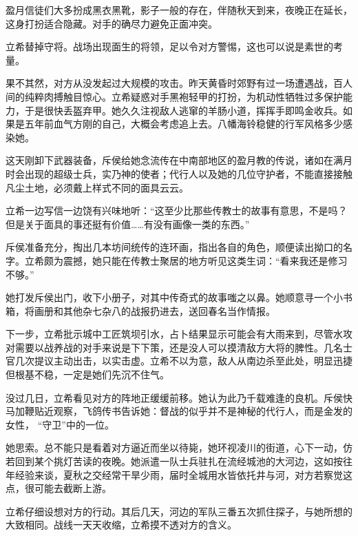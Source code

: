 \documentclass{article}
\begin{document}
盈月信徒们大多扮成黑衣黑靴，影子一般的存在，伴随秋天到来，夜晚正在延长，这身打扮适合隐藏。对手的确尽力避免正面冲突。



立希替掉守将。战场出现面生的将领，足以令对方警惕，这也可以说是素世的考量。



果不其然，对方从没发起过大规模的攻击。昨天黄昏时郊野有过一场遭遇战，百人间的纯粹肉搏触目惊心。立希疑惑对手黑袍轻甲的打扮，为机动性牺牲过多保护能力，于是很快丢盔弃甲。她久久注视敌人逃窜的羊肠小道，挥挥手即鸣金收兵。如果是五年前血气方刚的自己，大概会考虑追上去。八幡海铃稳健的行军风格多少感染她。



这天刚卸下武器装备，斥侯给她念流传在中南部地区的盈月教的传说，诸如在满月时会出现的超级士兵，实乃神的使者；代行人以及她的几位守护者，不能直接接触凡尘土地，必须戴上样式不同的面具云云。



立希一边写信一边饶有兴味地听：“这至少比那些传教士的故事有意思，不是吗？但是关于面具的事还挺有价值……有没有画像一类的东西。”



斥侯准备充分，掏出几本坊间统传的连环画，指出各自的角色，顺便读出拗口的名字。立希颇为震撼，她只能在传教士聚居的地方听见这类生词：“看来我还是修习不够。”



她打发斥侯出门，收下小册子，对其中传奇式的故事嗤之以鼻。她顺意寻一个小书箱，将画册和其他杂七杂八的战报扔进去，送回春名当作情报。



下一步，立希批示城中工匠筑坝引水，占卜结果显示可能会有大雨来到，尽管水攻对需要以战养战的对手来说是下下策，还是没人可以摸清敌方大将的脾性。几名士官几次提议主动出击，以实击虚。立希不以为意，敌人从南边杀至此处，明显迅捷但根基不稳，一定是她们先沉不住气。



没过几日，立希看见对方的阵地正缓缓前移。她认为此乃千载难逢的良机。斥侯快马加鞭贴近观察，飞鸽传书告诉她：督战的似乎并不是神秘的代行人，而是金发的女性， “守卫”中的一位。



她思索。总不能只是看着对方逼近而坐以待毙，她环视凌川的街道，心下一动，仿若回到某个挑灯苦读的夜晚。她派遣一队士兵驻扎在流经城池的大河边，这如按往年经验来谈，夏秋之交经常干旱少雨，届时全城用水皆依托井与河，对方若察觉这点，很可能去截断上游。



立希仔细设想对方的行动。其后几天，河边的军队三番五次抓住探子，与她所想的大致相同。战线一天天收缩，立希摸不透对方的含义。
\end{document}

